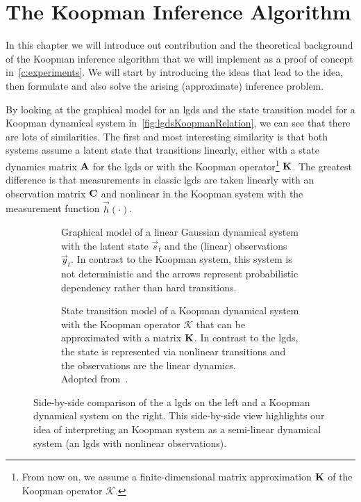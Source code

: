 \chapter{The Koopman Inference Algorithm}
\label{c:nonlinearGaussianKoopman}



In this chapter we will introduce out contribution and the theoretical background of the Koopman inference algorithm that we will implement as a proof of concept in~\autoref{c:experiments}. We will start by introducing the ideas that lead to the idea, then formulate and also solve the arising (approximate) inference problem.

By looking at the graphical model for an \ac{lgds} and the state transition model for a Koopman dynamical system in~\autoref{fig:lgdsKoopmanRelation}, we can see that there are lots of similarities. The first and most interesting similarity is that both systems assume a latent state that transitions linearly, either with a state dynamics matrix \(\boldsymbol{\mathrm{A}}\) for the \ac{lgds} or with the Koopman operator\footnote{From now on, we assume a finite-dimensional matrix approximation \(\boldsymbol{\mathrm{K}}\) of the Koopman operator \(\mathcal{K}\).} \(\boldsymbol{\mathrm{K}}\). The greatest difference is that measurements in classic \ac{lgds} are taken linearly with an observation matrix \( \boldsymbol{\mathrm{C}} \) and nonlinear in the Koopman system with the measurement function \( \vec{h}(\cdot) \).

\begin{figure}
	\centering
	\begin{subfigure}[t]{0.5\linewidth}
		\centering
		\resizebox{\linewidth}{!}{\tikzLinearGaussianDynamicalSystem}
		\caption{Graphical model of a linear Gaussian dynamical system with the latent state \(\vec{s}_t\) and the (linear) observations \(\vec{y}_t\). In contrast to the Koopman system, this system is not deterministic and the arrows represent probabilistic dependency rather than hard transitions.}
	\end{subfigure}%
	\begin{subfigure}[t]{0.5\linewidth}
		\centering
		\resizebox{\linewidth}{!}{\tikzKoopmanOperator}
		\caption{State transition model of a Koopman dynamical system with the Koopman operator \( \mathcal{K} \) that can be approximated with a matrix \(\boldsymbol{\mathrm{K}}\). In contrast to the \ac{lgds}, the state is represented via nonlinear transitions and the observations are the linear dynamics. \\ Adopted from~\cite{bruntonKoopmanInvariantSubspaces2016}.}
	\end{subfigure}
	\caption{Side-by-side comparison of the a \ac{lgds} on the left and a Koopman dynamical system on the right. This side-by-side view highlights our idea of interpreting an Koopman system as a semi-linear dynamical system (\ie an \ac{lgds} with nonlinear observations).}
	\label{fig:lgdsKoopmanRelation}
\end{figure}

